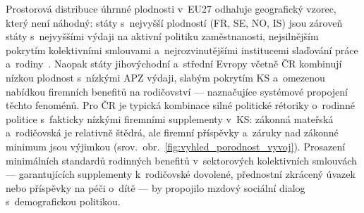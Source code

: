 Prostorová distribuce úhrnné plodnosti v~EU27 odhaluje geografický vzorec, který není náhodný: státy s~nejvyšší plodností (FR, SE, NO, IS) jsou zároveň státy s~nejvyššími výdaji na aktivní politiku zaměstnanosti, nejsilnějším pokrytím kolektivními smlouvami a~nejrozvinutějšími institucemi slaďování práce a~rodiny~\cite{eurostat_demo_find}.
Naopak státy jihovýchodní a~střední Evropy včetně ČR kombinují nízkou plodnost s~nízkými \ac{APZ} výdaji, slabým pokrytím \ac{KS} a~omezenou nabídkou firemních benefitů na rodičovství --- naznačujíce systémové propojení těchto fenoménů.
Pro ČR je typická kombinace silné politické rétoriky o~rodinné politice s~fakticky nízkými firemními supplementy v~\ac{KS}: zákonná mateřská a~rodičovská je relativně štědrá, ale firemní příspěvky a~záruky nad zákonné minimum jsou výjimkou (srov.~obr.~\ref{fig:vyhled_porodnost_vyvoj}).
Prosazení minimálních standardů rodinných benefitů v~sektorových kolektivních smlouvách --- garantujících supplementy k~rodičovské dovolené, přednostní zkrácený úvazek nebo příspěvky na péči o~dítě --- by propojilo mzdový sociální dialog s~demografickou politikou.

